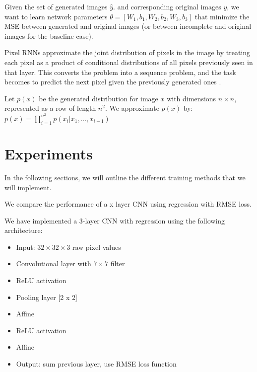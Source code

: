 \documentclass[10pt,twocolumn,letterpaper]{article}
\begin{document}
Given the set of generated images $\hat{y}$. and corresponding original images $y$, we want to learn network parameters  $ \theta = [W_1, b_1, W_2, b_2, W_3, b_3]$ that minimize the MSE between generated and original images (or between incomplete and original images for the baseline case). 



Pixel RNNs approximate the joint distribution of pixels in the image by treating each pixel as a product of conditional distributions of all pixels previously seen in that layer.  This converts the problem into a sequence problem, and the task becomes to predict the next pixel given the previously generated ones \cite{pixelRNN}. 

Let $p(x)$ be the generated distribution for image $x$ with dimensions $n \times n$, represented as a row of length $n^2$. We approximate $p(x)$ by: \\
$p(x) = \prod_{i=1}^{n^2} p(x_i | x_1, ... , x_{i-1} )$




\section{Experiments} 
In the following sections, we will outline the different training methods that we will implement. 

We compare the performance of a x layer CNN using regression with RMSE loss.


We have implemented a 3-layer CNN with regression using the following architecture: 

\begin{itemize}
\item Input: $32  \times  32  \times  3$ raw pixel values
\item Convolutional layer with $7  \times  7$ filter
\item ReLU activation
\item Pooling layer [2 x 2]
\item Affine
\item ReLU activation
\item Affine
\item Output: sum previous layer, use RMSE loss function
\end{itemize}
\end{document}
